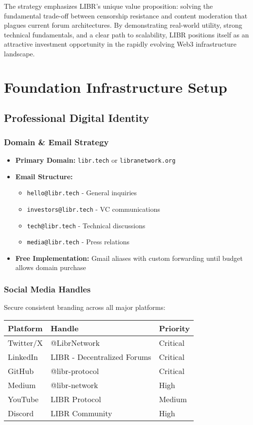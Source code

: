 \documentclass[12pt,a4paper]{article}
\begin{document}
The strategy emphasizes LIBR's unique value proposition: solving the fundamental trade-off between censorship resistance and content moderation that plagues current forum architectures. By demonstrating real-world utility, strong technical fundamentals, and a clear path to scalability, LIBR positions itself as an attractive investment opportunity in the rapidly evolving Web3 infrastructure landscape.

\section{Foundation Infrastructure Setup}

\subsection{Professional Digital Identity}

\subsubsection{Domain \& Email Strategy}
\begin{itemize}
    \item \textbf{Primary Domain:} \texttt{libr.tech} or \texttt{libranetwork.org}
    \item \textbf{Email Structure:}
    \begin{itemize}
        \item \texttt{hello@libr.tech} - General inquiries
        \item \texttt{investors@libr.tech} - VC communications
        \item \texttt{tech@libr.tech} - Technical discussions
        \item \texttt{media@libr.tech} - Press relations
    \end{itemize}
    \item \textbf{Free Implementation:} Gmail aliases with custom forwarding until budget allows domain purchase
\end{itemize}

\subsubsection{Social Media Handles}
Secure consistent branding across all major platforms:
\begin{center}
\begin{tabular}{|l|l|l|}
\hline
\textbf{Platform} & \textbf{Handle} & \textbf{Priority} \\
\hline
Twitter/X & @LibrNetwork & Critical \\
LinkedIn & LIBR - Decentralized Forums & Critical \\
GitHub & @libr-protocol & Critical \\
Medium & @libr-network & High \\
YouTube & LIBR Protocol & Medium \\
Discord & LIBR Community & High \\
\hline
\end{tabular}
\end{center}
\end{document}
